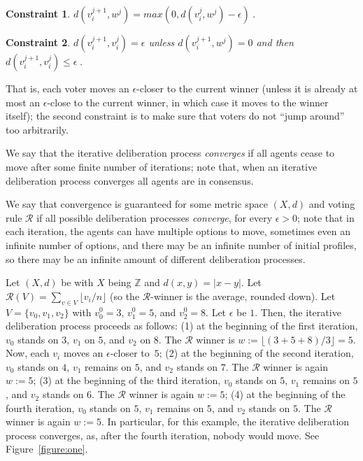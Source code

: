 \documentclass[runningheads,envcountsame]{llncs}
\newtheorem{constraint}{Constraint}
\begin{document}
\begin{constraint}\label{constraint:one}
  $d(v_i^{j + 1}, w^j) = max(0, d(v_i^j, w^j) - \epsilon)\ $.
\end{constraint}

\begin{constraint}\label{constraint:two}
  $d(v_i^{j+1}, v_i^{j})=\epsilon$ unless $d(v_i^{j + 1}, w^j)=0$ and then $d(v_i^{j+1}, v_i^{j}) \leq \epsilon\ $.
\end{constraint}

That is, each voter moves an $\epsilon$-closer to the current winner (unless it is already at most an $\epsilon$-close to the current winner, in which case it moves to the winner itself); the second constraint is to make sure that voters do not ``jump around'' too arbitrarily.

We say that the iterative deliberation process \emph{converges} if all agents cease to move after some finite number of iterations; note that, when an iterative deliberation process converges all agents are in consensus.

We say that convergence is guaranteed for some metric space $(X, d)$ and voting rule $\mathcal{R}$ if all possible deliberation processes \emph{converge}, for every $\epsilon > 0$; note that in each iteration, the agents can have multiple options to move, sometimes even an infinite number of options, and there may be an infinite number of initial profiles, so there may be an infinite amount of different deliberation processes.

\begin{example}\label{example:one}
%
Let $(X, d)$ be with $X$ being $\mathbb{Z}$ and $d(x, y) = |x - y|$. Let $\mathcal{R}(V) = \sum_{v \in V} \lfloor v_i / n \rfloor$ (so the $\mathcal{R}$-winner is the average, rounded down). Let $V = \{v_0, v_1, v_2\}$ with $v_0^0 = 3$, $v_1^0 = 5$, and $v_2^0 = 8$. Let $\epsilon$ be $1$. Then, the iterative deliberation process proceeds as follows:
  (1) at the beginning of the first iteration, $v_0$ stands on $3$, $v_1$ on $5$, and $v_2$ on $8$. The $\mathcal{R}$ winner is $w := \lfloor (3 + 5 + 8) / 3 \rfloor = 5$. Now, each $v_i$ moves an $\epsilon$-closer to~$5$; 
  (2) at the beginning of the second iteration, $v_0$ stands on $4$, $v_1$ remains on $5$, and $v_2$ stands on $7$. The $\mathcal{R}$ winner is again $w := 5$;
  (3) at the beginning of the third iteration, $v_0$ stands on $5$, $v_1$ remains on $5$, and $v_2$ stands on $6$. The $\mathcal{R}$ winner is again $w := 5$;
  (4) at the beginning of the fourth iteration, $v_0$ stands on $5$, $v_1$ remains on $5$, and $v_2$ stands on $5$. The $\mathcal{R}$ winner is again $w := 5$.
%
In particular, for this example, the iterative deliberation process converges, as, after the fourth iteration, nobody would move. See Figure~\ref{figure:one}.
%
\end{example}
\end{document}
